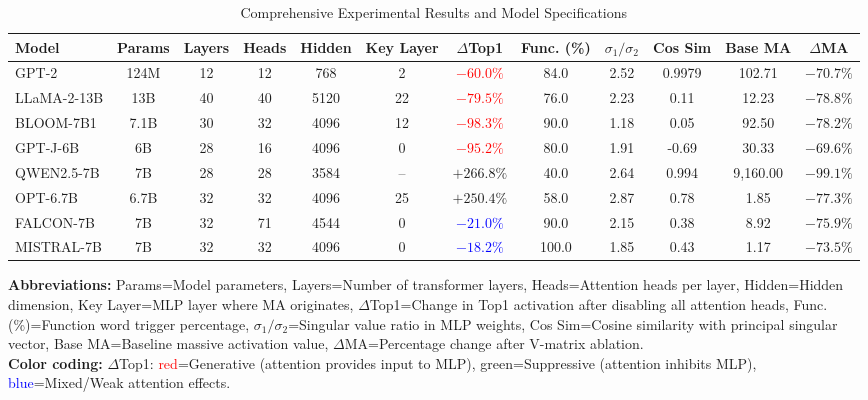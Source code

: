 \documentclass[conference]{IEEEtran}
\begin{document}
\begin{table}[htbp]
\centering
\caption{Comprehensive Experimental Results and Model Specifications}
\label{tab:comprehensive_experimental_results}
\footnotesize
\begin{tabular}{@{}lccccccccccc@{}}
\toprule
\textbf{Model} & \textbf{Params} & \textbf{Layers} & \textbf{Heads} & \textbf{Hidden} & \textbf{Key Layer} & \textbf{$\Delta$Top1} & \textbf{Func. (\%)} & \textbf{$\sigma_1/\sigma_2$} & \textbf{Cos Sim} & \textbf{Base MA} & \textbf{$\Delta$MA} \\
\midrule
GPT-2 & 124M & 12 & 12 & 768 & 2 & \textcolor{red}{$-60.0\%$} & 84.0 & 2.52 & 0.9979 & 102.71 & $-70.7\%$ \\
LLaMA-2-13B & 13B & 40 & 40 & 5120 & 22 & \textcolor{red}{$-79.5\%$} & 76.0 & 2.23 & 0.11 & 12.23 & $-78.8\%$ \\
BLOOM-7B1 & 7.1B & 30 & 32 & 4096 & 12 & \textcolor{red}{$-98.3\%$} & 90.0 & 1.18 & 0.05 & 92.50 & $-78.2\%$ \\
GPT-J-6B & 6B & 28 & 16 & 4096 & 0 & \textcolor{red}{$-95.2\%$} & 80.0 & 1.91 & -0.69 & 30.33 & $-69.6\%$ \\
\midrule
QWEN2.5-7B & 7B & 28 & 28 & 3584 & -- & \textcolor{green!60!black}{$+266.8\%$} & 40.0 & 2.64 & 0.994 & 9,160.00 & $-99.1\%$ \\
OPT-6.7B & 6.7B & 32 & 32 & 4096 & 25 & \textcolor{green!60!black}{$+250.4\%$} & 58.0 & 2.87 & 0.78 & 1.85 & $-77.3\%$ \\
\midrule
FALCON-7B & 7B & 32 & 71 & 4544 & 0 & \textcolor{blue}{$-21.0\%$} & 90.0 & 2.15 & 0.38 & 8.92 & $-75.9\%$ \\
MISTRAL-7B & 7B & 32 & 32 & 4096 & 0 & \textcolor{blue}{$-18.2\%$} & 100.0 & 1.85 & 0.43 & 1.17 & $-73.5\%$ \\
\bottomrule
\end{tabular}
\vspace{2mm}
\parbox{\linewidth}{\scriptsize
\textbf{Abbreviations:} Params=Model parameters, Layers=Number of transformer layers, Heads=Attention heads per layer, Hidden=Hidden dimension, Key Layer=MLP layer where MA originates, $\Delta$Top1=Change in Top1 activation after disabling all attention heads, Func. (\%)=Function word trigger percentage, $\sigma_1/\sigma_2$=Singular value ratio in MLP weights, Cos Sim=Cosine similarity with principal singular vector, Base MA=Baseline massive activation value, $\Delta$MA=Percentage change after V-matrix ablation. \\
\textbf{Color coding:} $\Delta$Top1: \textcolor{red}{red}=Generative (attention provides input to MLP), \textcolor{green!60!black}{green}=Suppressive (attention inhibits MLP), \textcolor{blue}{blue}=Mixed/Weak attention effects.}
\end{table}
\end{document}
